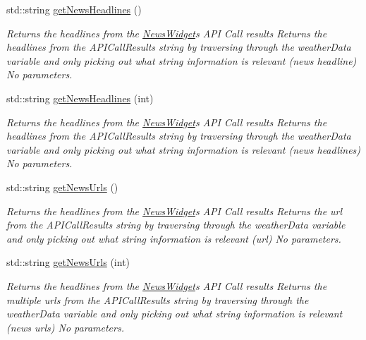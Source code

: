 \begin{DoxyCompactItemize}
std\+::string \mbox{\hyperlink{class_news_widget_a89b254028a1832afa896827e0e0cedf3}{get\+News\+Headlines}} ()
\begin{DoxyCompactList}\small\item\em Returns the headlines from the \mbox{\hyperlink{class_news_widget}{News\+Widget}}\textquotesingle{}s A\+PI Call results  Returns the headlines from the A\+P\+I\+Call\+Results string by traversing through the weather\+Data variable and only picking out what string information is relevant (news headline)  No parameters. \end{DoxyCompactList}\item 
std\+::string \mbox{\hyperlink{class_news_widget_a488154d90869f16341f533e7a2c96dfd}{get\+News\+Headlines}} (int)
\begin{DoxyCompactList}\small\item\em Returns the headlines from the \mbox{\hyperlink{class_news_widget}{News\+Widget}}\textquotesingle{}s A\+PI Call results  Returns the headlines from the A\+P\+I\+Call\+Results string by traversing through the weather\+Data variable and only picking out what string information is relevant (news headlines)  No parameters. \end{DoxyCompactList}\item 
std\+::string \mbox{\hyperlink{class_news_widget_a8528a1c4a46e6d2cf124fcb1720f5860}{get\+News\+Urls}} ()
\begin{DoxyCompactList}\small\item\em Returns the headlines from the \mbox{\hyperlink{class_news_widget}{News\+Widget}}\textquotesingle{}s A\+PI Call results  Returns the url from the A\+P\+I\+Call\+Results string by traversing through the weather\+Data variable and only picking out what string information is relevant (url)  No parameters. \end{DoxyCompactList}\item 
std\+::string \mbox{\hyperlink{class_news_widget_a746993897e9d477e5b3ff225faca2ae1}{get\+News\+Urls}} (int)
\begin{DoxyCompactList}\small\item\em Returns the headlines from the \mbox{\hyperlink{class_news_widget}{News\+Widget}}\textquotesingle{}s A\+PI Call results  Returns the multiple urls from the A\+P\+I\+Call\+Results string by traversing through the weather\+Data variable and only picking out what string information is relevant (news urls)  No parameters. \end{DoxyCompactList}\item 

\end{DoxyCompactItemize}
